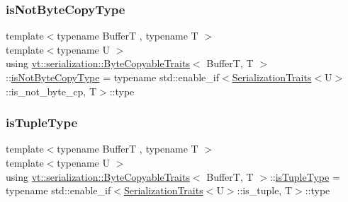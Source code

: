 \mbox{\label{structvt_1_1serialization_1_1_byte_copyable_traits_a9cbf2126e3b503513822b5f4f3dfa136}} 
\subsubsection{\texorpdfstring{is\+Not\+Byte\+Copy\+Type}{isNotByteCopyType}}
{\footnotesize\ttfamily template$<$typename BufferT , typename T $>$ \\
template$<$typename U $>$ \\
using \hyperlink{structvt_1_1serialization_1_1_byte_copyable_traits}{vt\+::serialization\+::\+Byte\+Copyable\+Traits}$<$ BufferT, T $>$\+::\hyperlink{structvt_1_1serialization_1_1_byte_copyable_traits_a9cbf2126e3b503513822b5f4f3dfa136}{is\+Not\+Byte\+Copy\+Type} =  typename std\+::enable\+\_\+if$<$\hyperlink{structvt_1_1serialization_1_1_serialization_traits}{Serialization\+Traits}$<$U$>$\+::is\+\_\+not\+\_\+byte\+\_\+cp, T$>$\+::type}

\mbox{\label{structvt_1_1serialization_1_1_byte_copyable_traits_ac6700c34f3c9642a029d3d3857811f59}} 
\subsubsection{\texorpdfstring{is\+Tuple\+Type}{isTupleType}}
{\footnotesize\ttfamily template$<$typename BufferT , typename T $>$ \\
template$<$typename U $>$ \\
using \hyperlink{structvt_1_1serialization_1_1_byte_copyable_traits}{vt\+::serialization\+::\+Byte\+Copyable\+Traits}$<$ BufferT, T $>$\+::\hyperlink{structvt_1_1serialization_1_1_byte_copyable_traits_ac6700c34f3c9642a029d3d3857811f59}{is\+Tuple\+Type} =  typename std\+::enable\+\_\+if$<$\hyperlink{structvt_1_1serialization_1_1_serialization_traits}{Serialization\+Traits}$<$U$>$\+::is\+\_\+tuple, T$>$\+::type}

